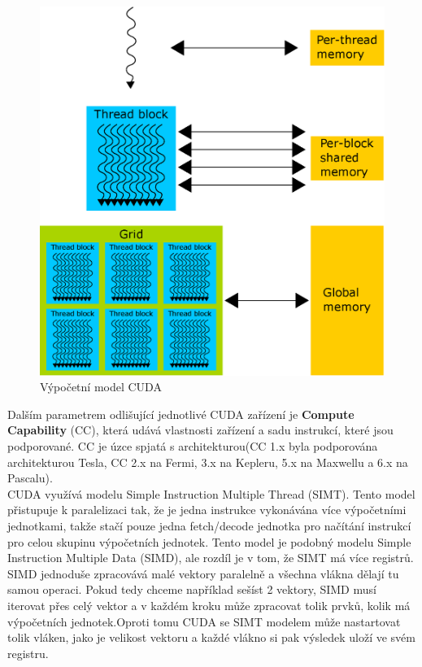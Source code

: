 \begin{figure}[h]
  \centering
  \includegraphics[width=0.8\linewidth]{img/CUDAmemoryHierarchy.eps}
  \caption{Výpočetní model CUDA}
  \label{fig:cudamemhierarchy}
\end{figure}

Dalším parametrem odlišující jednotlivé CUDA zařízení je \textbf{Compute Capability} (CC), která udává vlastnosti zařízení a sadu instrukcí, které jsou podporované. CC je úzce spjatá s architekturou(CC 1.x byla podporována architekturou Tesla, CC 2.x na Fermi, 3.x na Kepleru, 5.x na Maxwellu a 6.x na Pascalu).\\

CUDA využívá modelu Simple Instruction Multiple Thread (SIMT). Tento model přistupuje k paralelizaci tak, že je jedna instrukce vykonávána více výpočetními jednotkami, takže stačí pouze jedna fetch/decode jednotka pro načítání instrukcí pro celou skupinu výpočetních jednotek. Tento model je podobný modelu Simple Instruction Multiple Data (SIMD), ale rozdíl je v tom, že SIMT má více registrů. SIMD jednoduše zpracovává malé vektory paralelně a všechna vlákna dělají tu samou operaci. Pokud tedy chceme například sešíst 2 vektory, SIMD musí iterovat přes celý vektor a v každém kroku může zpracovat tolik prvků, kolik má výpočetních jednotek.Oproti tomu CUDA se SIMT modelem může nastartovat tolik vláken, jako je velikost vektoru a každé vlákno si pak výsledek uloží ve svém registru.\\

